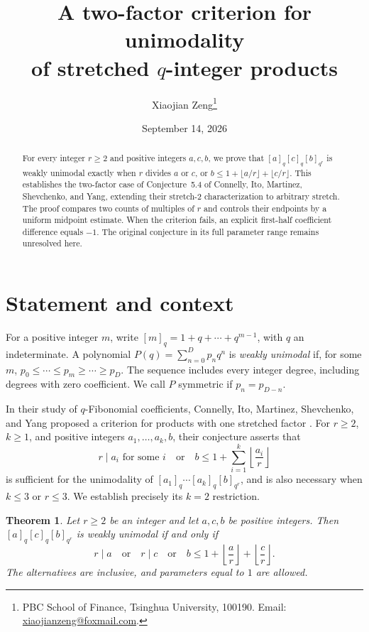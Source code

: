 \documentclass[11pt]{article}
\title{A two-factor criterion for unimodality\protect\\
of stretched $q$-integer products}
\author{Xiaojian Zeng\thanks{PBC School of Finance, Tsinghua University,
100190. Email: \href{mailto:xiaojianzeng@foxmail.com}{xiaojianzeng@foxmail.com}.}}
\date{September 14, 2026}
\newtheorem{theorem}{Theorem}
\begin{document}
\maketitle
\begin{abstract}
For every integer $r\ge2$ and positive integers $a,c,b$, we prove that
$[a]_q[c]_q[b]_{q^r}$ is weakly unimodal exactly when $r$ divides $a$ or $c$,
or $b\le1+\lfloor a/r\rfloor+\lfloor c/r\rfloor$.
This establishes the two-factor case of Conjecture~5.4 of Connelly, Ito,
Martinez, Shevchenko, and Yang, extending their stretch-$2$ characterization
to arbitrary stretch. The proof compares two counts of multiples of $r$
and controls their endpoints by a uniform midpoint estimate. When the
criterion fails, an explicit first-half coefficient difference equals $-1$.
The original conjecture in its full parameter range remains unresolved here.
\end{abstract}

\section{Statement and context}
For a positive integer $m$, write $[m]_q=1+q+\cdots+q^{m-1}$, with $q$
an indeterminate. A polynomial $P(q)=\sum_{n=0}^D p_nq^n$ is
\emph{weakly unimodal} if, for some $m$,
$p_0\le\cdots\le p_m\ge\cdots\ge p_D$.
The sequence includes every integer degree, including degrees with zero
coefficient. We call $P$ symmetric if $p_n=p_{D-n}$.

In their study of $q$-Fibonomial coefficients, Connelly, Ito, Martinez,
Shevchenko, and Yang proposed a criterion for products with one stretched
factor \cite[Conjecture~5.4]{CIMSY2026}. For $r\ge2$, $k\ge1$, and positive
integers $a_1,\ldots,a_k,b$, their conjecture asserts that
\begin{equation}\label{eq:parent}
 r\mid a_i\text{ for some }i
 \quad\text{or}\quad
 b\le1+\sum_{i=1}^k\left\lfloor \frac{a_i}{r}\right\rfloor
\end{equation}
is sufficient for the unimodality of
$[a_1]_q\cdots[a_k]_q[b]_{q^r}$, and is also necessary when $k\le3$ or
$r\le3$. We establish precisely its $k=2$ restriction.

\begin{theorem}\label{thm:main}
Let $r\ge2$ be an integer and let $a,c,b$ be positive integers. Then
$[a]_q[c]_q[b]_{q^r}$ is weakly unimodal if and only if
\begin{equation}\label{eq:criterion}
 r\mid a\quad\text{or}\quad r\mid c\quad\text{or}\quad
 b\le1+\left\lfloor \frac{a}{r}\right\rfloor+\left\lfloor \frac{c}{r}\right\rfloor.
\end{equation}
The alternatives are inclusive, and parameters equal to $1$ are allowed.
\end{theorem}
\end{document}

